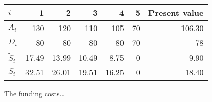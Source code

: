 \documentclass[../main.tex]{subfiles}
\begin{document}
        \begin{table}[h]
            \centering\begin{tabular}{l|rrrrr||r}
                $i$ & 1 & 2 & 3 & 4 & 5 & Present value \\
                \hline
                $A_{i}$ & 130 & 120 & 110 & 105 & 70 & 106.30 \\
                $D_{i}$ & 80 & 80 & 80 & 80 & 70 & 78 \\
                $\tilde{S}_{i}$ & 17.49 & 13.99 & 10.49 & 8.75 & 0 & 9.90 \\
                $S_{i}$ & 32.51 & 26.01 & 19.51 & 16.25 & 0 & 18.40 \\
            \end{tabular}
            \label{tbl:equity-funding-payoff}
        \end{table}

        The funding costs\dots
\end{document}
